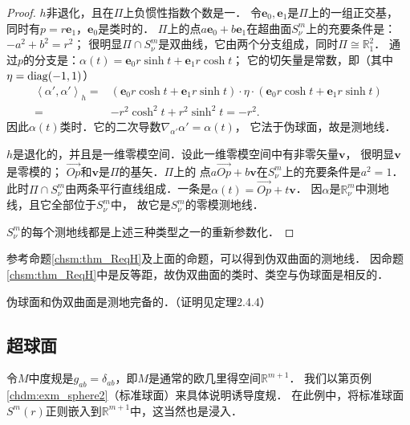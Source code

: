 \begin{proof}
     $h$非退化，且在$\Pi$上负惯性指数个数是一．
    令$\boldsymbol{e}_0,\boldsymbol{e}_1$是$\Pi$上的一组正交基，
    同时有$p=r\boldsymbol{e}_1$，$\boldsymbol{e}_0$是类时的．
    $\Pi$上的点$a\boldsymbol{e}_0+b\boldsymbol{e}_1$在超曲面$S^m_\nu$上的充要条件是：$-a^2+b^2=r^2$；
    很明显$\Pi \cap S^m_\nu$是双曲线，它由两个分支组成，同时$\Pi\cong \mathbb{R}^2_1$．
    通过$p$的分支是：$\alpha(t)= \boldsymbol{e}_0 r \sinh t +\boldsymbol{e}_1 r \cosh t $；
    它的切矢量是常数，即（其中$\eta={\rm diag}(-1,1)$）
    \begin{align*}
        \left<\alpha', \alpha'\right>_h
        =&\left( \boldsymbol{e}_0 r \cosh t +\boldsymbol{e}_1 r \sinh t \right) \cdot\eta\cdot
         \left( \boldsymbol{e}_0 r \cosh t +\boldsymbol{e}_1 r \sinh t \right) \\
        =&-r^2 \cosh^2t+ r^2 \sinh^2 t =-r^2 .
    \end{align*}
    因此$\alpha(t)$类时．它的二次导数$\nabla_{\alpha'}\alpha' =\alpha(t)$，
    它法于伪球面，故是测地线．
    
     $h$是退化的，并且是一维零模空间．设此一维零模空间中有非零矢量$\boldsymbol{v}$，
    很明显$\boldsymbol{v}$是零模的；
    $\overrightarrow{Op}$和$\boldsymbol{v}$是$\Pi$的基矢．$\Pi$上的
    点$a\overrightarrow{Op}+b\boldsymbol{v}$在$S^m_\nu$上的充要条件是$a^2=1$．
    此时$\Pi\cap S^m_\nu$由两条平行直线组成．一条是$\alpha(t)=\overrightarrow{Op}+t\boldsymbol{v}$．
    因$\alpha$是$\mathbb{R}^m_\nu$中测地线，且它全部位于$S^m_\nu$中，
    故它是$S^m_\nu$的零模测地线．
    
    $S^m_\nu$的每个测地线都是上述三种类型之一的重新参数化．
\end{proof}

参考命题\ref{chsm:thm_ReqH}及上面的命题，可以得到伪双曲面的测地线．
因命题\ref{chsm:thm_ReqH}中是反等距，故伪双曲面的类时、类空与伪球面是相反的．


\begin{proposition}\label{chsm:thm_SH-complete}
    伪球面和伪双曲面是测地完备的．（证明见\parencite{wolf_SCC-2011}定理2.4.4）
\end{proposition}


\subsection{超球面}\label{chsm:sec_sphere}
令$M$中度规是$g_{ab}=\delta_{ab}$，即$M$是通常的欧几里得空间$\mathbb{R}^{m+1}$．
我们以第\pageref{chdm:exm_sphere2}页例\ref{chdm:exm_sphere2}（标准球面）来具体说明诱导度规．
在此例中，将标准球面$S^m(r)$正则嵌入到$\mathbb{R}^{m+1}$中，这当然也是浸入．

